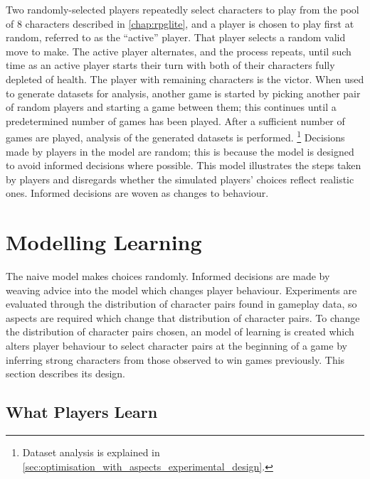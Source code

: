 
Two randomly-selected players repeatedly select characters to play from the pool
of 8 characters described in \cref{chap:rpglite}, and a player is chosen to play
first at random, referred to as the ``active'' player. That player selects a
random valid move to make. The active player alternates, and the process
repeats, until such time as an active player starts their turn with both of
their characters fully depleted of health. The player with remaining characters
is the victor. When used to generate datasets for analysis, another game is
started by picking another pair of random players and starting a game between
them; this continues until a predetermined number of games has been played.
After a sufficient number of games are played, analysis of the generated datasets
is performed. \footnote{Dataset analysis is explained in
\cref{sec:optimisation_with_aspects_experimental_design}.}
Decisions made by players in the model are random; this is because the model is
designed to avoid informed decisions where possible. This model illustrates the
steps taken by players and disregards whether the simulated players' choices
reflect realistic ones. Informed decisions are woven as \aspectoriented{}
changes to behaviour.






\section{Modelling Learning}
\label{learning_model_definition}

The naive model makes choices randomly. Informed decisions are made by weaving
advice into the model which changes player behaviour. Experiments are evaluated
through the distribution of character pairs found in gameplay data, so aspects
are required which change that distribution of character pairs. To change the
distribution of character pairs chosen, an \aspectoriented{} model of learning
is created which alters player behaviour to select character pairs at the
beginning of a game by inferring strong characters from those observed to win
games previously. This section describes its design.

\subsection{What Players Learn}

